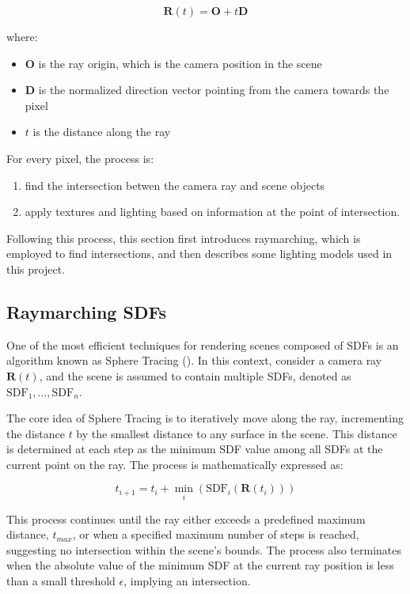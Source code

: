 \begin{equation}
 \mathbf{R}(t) = \mathbf{O} + t\mathbf{D} 
\end{equation}

where:
\begin{itemize}
    \item $\mathbf{O}$ is the ray origin, which is the camera position in the scene
    \item $\mathbf{D}$ is the normalized direction vector pointing from the camera towards the pixel
    \item $t$ is the distance along the ray
\end{itemize}

For every pixel, the process is:
\begin{enumerate}
    \item find the intersection betwen the camera ray and scene objects
    \item apply textures and lighting based on information at the point of intersection.
\end{enumerate}

Following this process, this section first introduces raymarching, which is employed to find intersections, and then describes some lighting models used in this project.

\subsection{Raymarching SDFs}

One of the most efficient techniques for rendering scenes composed of SDFs is an algorithm known as Sphere Tracing (). In this context, consider a camera ray $\mathbf{R}(t)$, and the scene is assumed to contain multiple SDFs, denoted as $\text{SDF}_1, \dots, \text{SDF}_n$.

The core idea of Sphere Tracing is to iteratively move along the ray, incrementing the distance $t$ by the smallest distance to any surface in the scene. This distance is determined at each step as the minimum SDF value among all SDFs at the current point on the ray. The process is mathematically expressed as:

\begin{equation}
    t_{i+1} = t_{i} + \min_i(\text{SDF}_i(\mathbf{R}(t_i)))
\end{equation}

This process continues until the ray either exceeds a predefined maximum distance, $t_{max}$, or when a specified maximum number of steps is reached, suggesting no intersection within the scene's bounds. The process also terminates when the absolute value of the minimum SDF at the current ray position is less than a small threshold $\epsilon$, implying an intersection.

